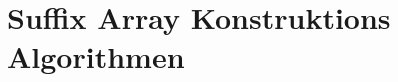 \chapter{Suffix Array Konstruktions Algorithmen}
% 
% 
% 

\newpage
% 
% 
% 
% 
% 
% 
% 
% 
% 
% 
%
